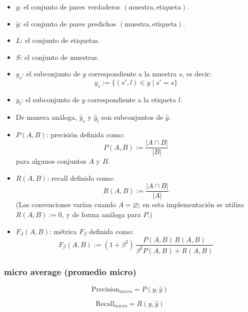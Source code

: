 \begin{itemize}
    \item $y$: el conjunto de pares verdaderos $(\text{muestra}, \text{etiqueta})$.
    
    \item $\hat{y}$: el conjunto de pares predichos $(\text{muestra}, \text{etiqueta})$.
    
    \item $L$: el conjunto de etiquetas.
    
    \item $S$: el conjunto de muestras.
    
    \item $y_s$: el subconjunto de $y$ correspondiente a la muestra $s$, es decir:
    \[
    y_s := \{(s', l) \in y \mid s' = s\}
    \]
    
    \item $y_l$: el subconjunto de $y$ correspondiente a la etiqueta $l$.
    
    \item De manera análoga, $\hat{y}_s$ y $\hat{y}_l$ son subconjuntos de $\hat{y}$.
    
    \item $P(A, B)$: precisión definida como:
    \[
    P(A, B) := \frac{|A \cap B|}{|B|}
    \]
    para algunos conjuntos $A$ y $B$.
    
    \item $R(A, B)$: recall definido como:
    \[
    R(A, B) := \frac{|A \cap B|}{|A|}
    \]
    (Las convenciones varían cuando $A = \varnothing$; en esta implementación se utiliza
    $R(A, B) := 0$, y de forma análoga para $P$.)
    
    \item $F_{\beta}(A, B)$: métrica $F_{\beta}$ definida como:
    \[
    F_{\beta}(A, B) := (1 + \beta^2)\,
    \frac{P(A, B)\, R(A, B)}{\beta^2 P(A, B) + R(A, B)}
    \]
\end{itemize}


\subsubsection{micro average (promedio micro)}

\begin{equation}
\text{Precision}_{micro} = P(y, \hat{y})
\end{equation}

\begin{equation}
\text{Recall}_{micro} = R(y, \hat{y})
\end{equation}

